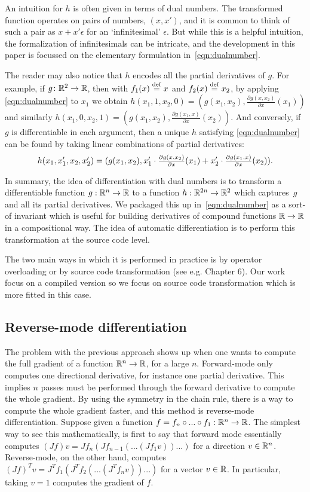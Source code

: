 An intuition for $h$ is often given in terms of dual numbers.
The transformed function operates on pairs of numbers, $(x,x')$, and it is common
to think of such a pair as $x+x'\epsilon$ for an `infinitesimal' $\epsilon$.
But while this is a helpful intuition, the formalization of infinitesimals can be intricate, 
and the development in this paper is focussed on the elementary formulation in~\eqref{eqn:dualnumber}. 

The reader may also notice that $h$ encodes all the partial derivatives of
$g$. For example, 
if $g \colon \mathbb{R}^2\to \mathbb{R}$, then with $f_1(x)\stackrel {\mathrm{def}}= x$ and $f_2(x)\stackrel {\mathrm{def}}= x_2$, by applying \eqref{eqn:dualnumber} to $x_1$ we obtain
$h(x_1,1,x_2,0)=(g(x_1,x_2), \frac {\partial g(x,x_2)}{\partial x}(x_1))$
and similarly 
$h(x_1,0,x_2,1)=(g(x_1,x_2), \frac {\partial g(x_1,x)}{\partial x}(x_2))$.
And conversely, if $g$ is differentiable in each argument, then
a unique $h$ satisfying \eqref{eqn:dualnumber} can be found by taking linear
combinations of partial derivatives:
\[\textstyle h(x_1,x_1',x_2,x_2')=(g(x_1,x_2),x_1' \cdot\frac {\partial g(x,x_2)}{\partial x}(x_1)+x_2'\cdot \frac {\partial g(x_1,x)}{\partial x}(x_2))\text.\]

In summary, the idea of differentiation with dual numbers is 
to transform a differentiable function
$g:\mathbb{R}^n\to \mathbb{R}$ to a function $h:\mathbb{R}^{2n}\to \mathbb{R}^2$ which captures~$g$ and all its partial derivatives. We packaged this up in~\eqref{eqn:dualnumber} as a sort-of invariant which is useful for building derivatives of compound functions $\mathbb{R}\to\mathbb{R}$ in a compositional way.
The idea of automatic differentiation is to perform this transformation at the source code level. 

The two main ways in which it is performed in practice is by operator overloading or by source code transformation (see e.g. \cite{griewank2008evaluating} Chapter 6). 
Our work focus on a compiled version so we focus on source code transformation which is more fitted in this case.

\subsection{Reverse-mode differentiation}

The problem with the previous approach shows up when one wants to compute the full gradient of a function $\mathbb{R}^n\to\mathbb{R}$, for a large $n$. 
Forward-mode only computes one directional derivative, for instance one partial derivative. This implies $n$ passes must be performed through the forward derivative to compute the whole gradient.
By using the symmetry in the chain rule, there is a way to compute the whole gradient faster, and this method is reverse-mode differentiation.
Suppose given a function $f=f_n\circ...\circ f_1 :\mathbb{R}^n\to\mathbb{R}$. 
The simplest way to see this mathematically, is first to say that forward mode essentially computes $(Jf)v=Jf_n(Jf_{n-1}(...(Jf_1v))...)$ for a direction $v\in\mathbb{R}^n$. 
Reverse-mode, on the other hand, computes $(Jf)^Tv =J^Tf_1(J^Tf_{2}(...(J^Tf_nv))...)$ for a vector $v\in\mathbb{R}$.
In particular, taking $v=1$ computes the gradient of $f$.

